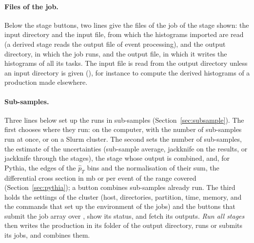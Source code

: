 \paragraph{Files of the job.}
Below the stage buttons, two lines give the files of the job of the stage shown: the input directory and the input
file, from which the histograms imported are read (a derived stage reads the output file of event processing), and the
output directory, in which the job runs, and the output file, in which it writes the histograms of all its tasks. The
input file is read from the output directory unless an input directory is given (), for
instance to compute the derived histograms of a production made elsewhere.

\paragraph{Sub-samples.}
Three lines below set up the runs in sub-samples (Section~\ref{sec:subsample}). The first chooses where they run: on
the computer, with the number of sub-samples run at once, or on a Slurm cluster. The second sets the number of
sub-samples, the estimate of the uncertainties (sub-sample average, jackknife on the results, or jackknife through the
stages), the stage whose output is combined, and, for Pythia, the edges of the $\hat{p}_T$ bins and the normalisation
of their sum, the differential cross section in mb or per event of the range covered (Section~\ref{sec:pythia}); a
button combines sub-samples already run. The third holds the settings of the cluster (host, directories, partition,
time, memory, and the commands that set up the environment of the jobs) and the buttons that submit the job array
over , show its status, and fetch its outputs. \emph{Run all stages} then writes the production in its
folder of the output directory, runs or submits its jobs, and combines them.
